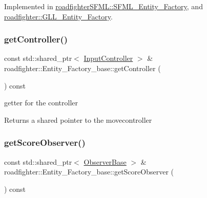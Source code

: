 Implemented in \hyperlink{classroadfighterSFML_1_1SFML__Entity__Factory_a3944854c727ab2c6c5007acff997c0b4}{roadfighter\+S\+F\+M\+L\+::\+S\+F\+M\+L\+\_\+\+Entity\+\_\+\+Factory}, and \hyperlink{classroadfighter_1_1GLL__Entity__Factory_aa176b2bec6007989c5cf3658840123c7}{roadfighter\+::\+G\+L\+L\+\_\+\+Entity\+\_\+\+Factory}.

\mbox{\label{classroadfighter_1_1Entity__Factory__base_a3ea098a47127d87d64a6a8623035007a}} 
\subsubsection{\texorpdfstring{get\+Controller()}{getController()}}
{\footnotesize\ttfamily const std\+::shared\+\_\+ptr$<$ \hyperlink{classroadfighter_1_1InputController}{Input\+Controller} $>$ \& roadfighter\+::\+Entity\+\_\+\+Factory\+\_\+base\+::get\+Controller (\begin{DoxyParamCaption}{ }\end{DoxyParamCaption}) const}

getter for the controller \begin{DoxyReturn}{Returns}
a shared pointer to the movecontroller 
\end{DoxyReturn}
\mbox{\label{classroadfighter_1_1Entity__Factory__base_a7b45161be0cda25b24375f6e99594bcc}} 
\subsubsection{\texorpdfstring{get\+Score\+Observer()}{getScoreObserver()}}
{\footnotesize\ttfamily const std\+::shared\+\_\+ptr$<$ \hyperlink{classroadfighter_1_1ObserverBase}{Observer\+Base} $>$ \& roadfighter\+::\+Entity\+\_\+\+Factory\+\_\+base\+::get\+Score\+Observer (\begin{DoxyParamCaption}{ }\end{DoxyParamCaption}) const}

